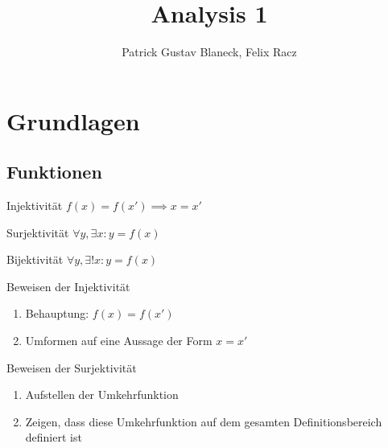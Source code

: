 \documentclass[german]{spicker}
\title{Analysis 1}
\author{Patrick Gustav Blaneck, Felix Racz}
\begin{document}
\maketitle
\tableofcontents
\newpage


\section{Grundlagen}

\subsection{Funktionen}

\begin{thirdboxl}
    \begin{defi}{Injektivität}
        $f(x) = f(x')\implies x = x'$
    \end{defi}
\end{thirdboxl}%
\begin{thirdboxm}
    \begin{defi}{Surjektivität}
        $\forall y, \exists x: y = f(x)$
    \end{defi}
\end{thirdboxm}%
\begin{thirdboxr}
    \begin{defi}{Bijektivität}
        $\forall y, \exists! x: y = f(x)$
    \end{defi}
\end{thirdboxr}%

\begin{algo}{Beweisen der Injektivität}
    \begin{enumerate}
        \item Behauptung: $f(x) = f(x')$
        \item Umformen auf eine Aussage der Form $x = x'$
    \end{enumerate}
\end{algo}

\begin{algo}{Beweisen der Surjektivität}
    \begin{enumerate}
        \item Aufstellen der Umkehrfunktion
        \item Zeigen, dass diese Umkehrfunktion auf dem gesamten Definitionsbereich definiert ist
    \end{enumerate}
\end{algo}
\end{document}
